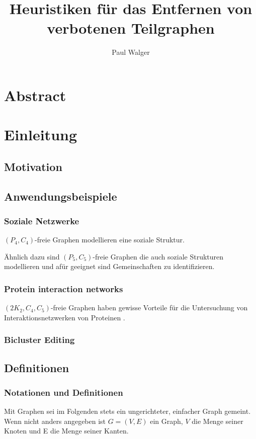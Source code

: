 \documentclass[12pt,a4paper,onecolumn,oneside,titlepage]{article}
\author{Paul Walger}
\title{Heuristiken für das Entfernen von verbotenen Teilgraphen}
\begin{document}
\maketitle
\tableofcontents
\newpage

\section{Abstract}

\section{Einleitung}


\subsection{Motivation}


\subsection{Anwendungsbeispiele}

\subsubsection{Soziale Netzwerke}
$(P_4,C_4)$-freie Graphen modellieren eine soziale Struktur.\cite{NastosG13}

Ähnlich dazu sind $(P_5,C_5)$-freie Graphen die auch soziale Strukturen modellieren und afür geeignet sind Gemeinschaften zu identifizieren. \cite{Schoch15}

\subsubsection{Protein interaction networks}
$(2K_2, C_4, C_5)$-freie Graphen haben gewisse Vorteile für die Untersuchung von Interaktionsnetzwerken von Proteinen \cite{BrucknerHK15}.

\subsubsection{Bicluster Editing}
\cite{De12}\cite{Madeira04} 

\subsection{Definitionen}
\subsubsection{Notationen und Definitionen}
Mit Graphen sei im Folgenden stets ein ungerichteter, einfacher Graph gemeint. Wenn nicht anders angegeben ist $G=(V,E)$ ein Graph, $V$ die Menge seiner Knoten und E die Menge seiner Kanten.
\end{document}
